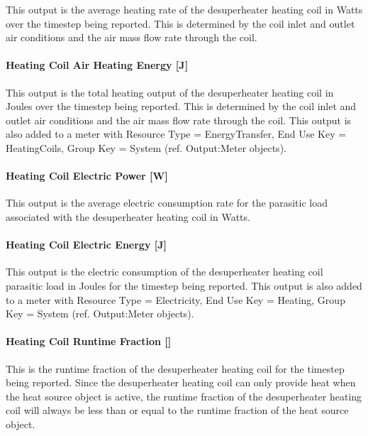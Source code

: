 This output is the average heating rate of the desuperheater heating coil in Watts over the timestep being reported. This is determined by the coil inlet and outlet air conditions and the air mass flow rate through the coil.

\paragraph{Heating Coil Air Heating Energy {[}J{]}}\label{heating-coil-air-heating-energy-j-1}

This output is the total heating output of the desuperheater heating coil in Joules over the timestep being reported. This is determined by the coil inlet and outlet air conditions and the air mass flow rate through the coil. This output is also added to a meter with Resource Type = EnergyTransfer, End Use Key = HeatingCoils, Group Key = System (ref. Output:Meter objects).

\paragraph{Heating Coil Electric Power {[}W{]}}\label{heating-coil-electric-power-w-2}

This output is the average electric consumption rate for the parasitic load associated with the desuperheater heating coil in Watts.

\paragraph{Heating Coil Electric Energy {[}J{]}}\label{heating-coil-electric-energy-j-1}

This output is the electric consumption of the desuperheater heating coil parasitic load in Joules for the timestep being reported. This output is also added to a meter with Resource Type = Electricity, End Use Key = Heating, Group Key = System (ref. Output:Meter objects).

\paragraph{\texorpdfstring{Heating Coil Runtime Fraction {[]}}{Heating Coil Runtime Fraction }}\label{heating-coil-runtime-fraction}

This is the runtime fraction of the desuperheater heating coil for the timestep being reported. Since the desuperheater heating coil can only provide heat when the heat source object is active, the runtime fraction of the desuperheater heating coil will always be less than or equal to the runtime fraction of the heat source object.

